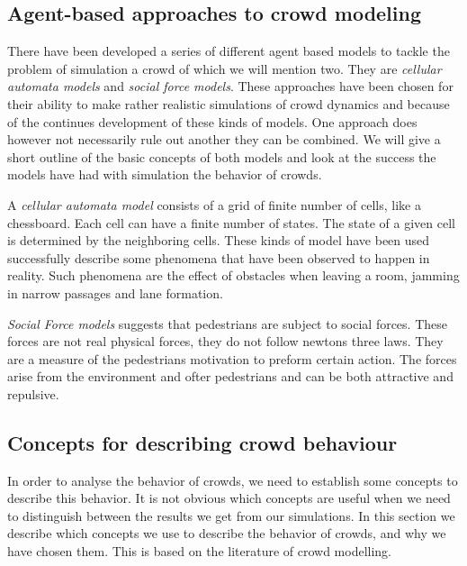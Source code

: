 \subsection{Agent-based approaches to crowd modeling}\label{subsec:ABapproach}
There have been developed a series of different agent based models to tackle the 
problem of simulation a crowd of which we will mention two. They are 
\emph{cellular automata models} and \emph{social force models}. These approaches 
have been chosen for their ability to make rather realistic simulations of 
crowd dynamics and because of the continues development of these kinds of models.
One approach does however not necessarily rule out another they can be combined. 
We will give a short outline of the basic concepts of both models and look at the 
success the models have had with simulation the behavior of crowds. 

A \emph{cellular automata model} consists of a grid of finite number of cells, like a chessboard. 
Each cell can have a finite number of states. The state of a given cell is determined by the 
neighboring cells. These kinds of model have been used successfully describe some phenomena 
that have been observed to happen in reality. Such phenomena are the effect of obstacles when 
leaving a room, jamming in narrow passages and lane formation. 

\emph{Social Force models} suggests that pedestrians are subject to social forces. These 
forces are not real physical forces, they do not follow newtons three laws. They are a 
measure of the pedestrians motivation to preform certain action. The forces arise from 
the environment and ofter pedestrians and can be both attractive and repulsive.


\subsection{Concepts for describing crowd behaviour}\label{concepts}
In order to analyse the behavior of crowds, we need to establish some 
concepts to describe this behavior. It is not obvious which concepts  are 
useful when we need to distinguish between the results we get from our 
simulations. In this section we describe which concepts we use to describe the 
behavior of crowds, and why we have chosen them. This is based on the 
literature of crowd modelling.

